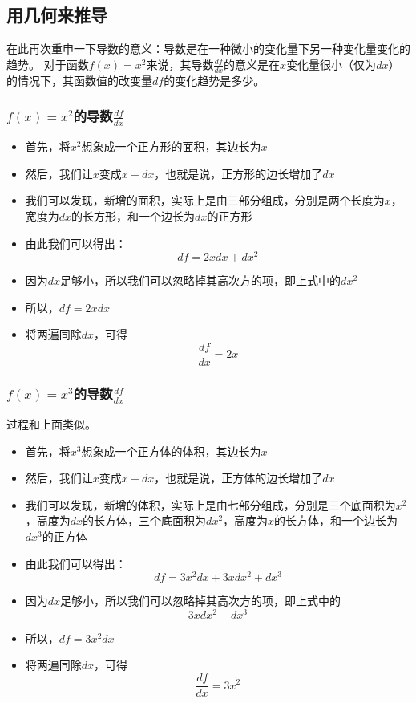 \documentclass[UTF8]{ctexart}
\begin{document}
\subsection{用几何来推导}
在此再次重申一下导数的意义：导数是在一种微小的变化量下另一种变化量变化的趋势。
对于函数$f(x) = x^2$来说，其导数$\frac{df}{dx}$的意义是在$x$变化量很小（仅为$dx$）的情况下，其函数值的改变量$df$的变化趋势是多少。
\subsubsection{$f(x) = x^2$的导数$\frac{df}{dx}$}
\begin{itemize}
	\item 首先，将$x^2$想象成一个正方形的面积，其边长为$x$
	\item 然后，我们让$x$变成$x+dx$，也就是说，正方形的边长增加了$dx$
	\item 我们可以发现，新增的面积，实际上是由三部分组成，分别是两个长度为$x$，宽度为$dx$的长方形，和一个边长为$dx$的正方形
	\item 由此我们可以得出：$$df = 2xdx + dx^2$$
	\item 因为$dx$足够小，所以我们可以忽略掉其高次方的项，即上式中的$dx^2$
	\item 所以，$df = 2xdx$
	\item 将两遍同除$dx$，可得$$\frac{df}{dx} = 2x$$
\end{itemize}

\subsubsection{$f(x) = x^3$的导数$\frac{df}{dx}$}
过程和上面类似。
\begin{itemize}
	\item 首先，将$x^3$想象成一个正方体的体积，其边长为$x$
	\item 然后，我们让$x$变成$x+dx$，也就是说，正方体的边长增加了$dx$
	\item 我们可以发现，新增的体积，实际上是由七部分组成，分别是三个底面积为$x^2$，高度为$dx$的长方体，三个底面积为$dx^2$，高度为$x$的长方体，和一个边长为$dx^3$的正方体
	\item 由此我们可以得出：$$df = 3x^2dx + 3xdx^2 + dx^3$$
	\item 因为$dx$足够小，所以我们可以忽略掉其高次方的项，即上式中的$$3xdx^2 + dx^3$$
	\item 所以，$df = 3x^2dx$
	\item 将两遍同除$dx$，可得$$\frac{df}{dx} = 3x^2$$
\end{itemize}
\end{document}
